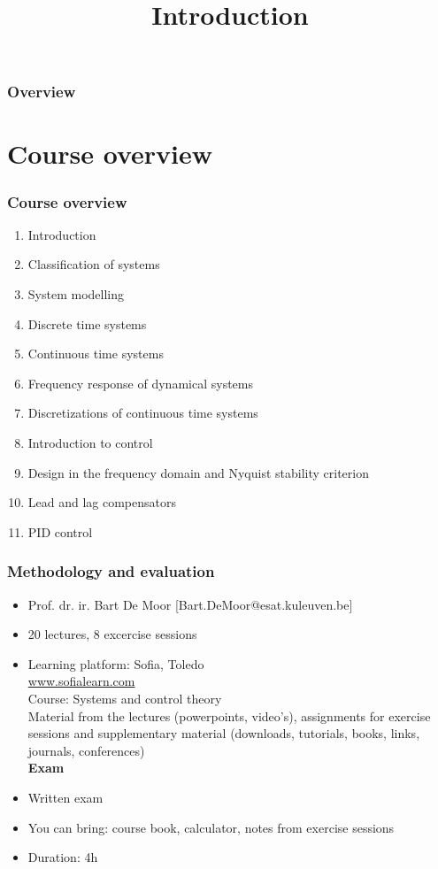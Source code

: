 \documentclass{beamer}
\title{Introduction}
\author{}
\begin{document}
\begin{frame}
\titlepage
\end{frame}

\begin{frame}
\frametitle{Overview} 
\tableofcontents
\end{frame}


\section{Course overview} 

\begin{frame}
\frametitle{Course overview}
\begin{enumerate}
\item Introduction
\item Classification of systems
\item System modelling
\item Discrete time systems
\item Continuous time systems
\item Frequency response of dynamical systems
\item Discretizations of continuous time systems
\item Introduction to control
\item Design in the frequency domain and Nyquist stability criterion
\item Lead and lag compensators
\item PID control
\end{enumerate}
\end{frame}


\begin{frame}
\frametitle{Methodology and evaluation}
\begin{itemize}
\item Prof. dr. ir. Bart De Moor ‎[Bart.DeMoor@esat.kuleuven.be]‎
\item 20 lectures, 8 excercise sessions\\
\item Learning platform: Sofia, Toledo\\
\url{www.sofialearn.com}\\
Course: Systems and control theory\\
Material from the lectures (powerpoints, video's), assignments for exercise sessions and supplementary material (downloads, tutorials, books, links, journals, conferences)\\
\bigskip
\textbf{Exam}
\item Written exam
\item You can bring: course book, calculator, notes from exercise sessions
\item Duration: 4h
\end{itemize}
\end{frame}
\end{document}
